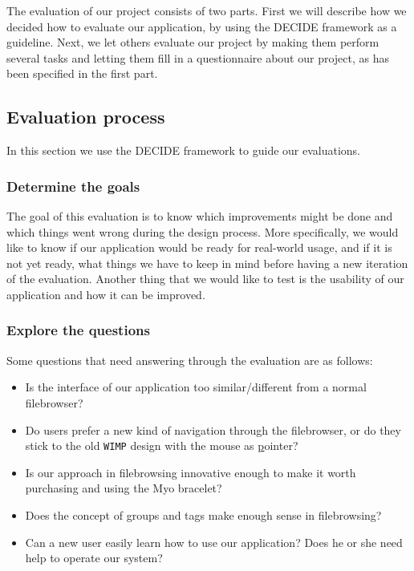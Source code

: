 \documentclass{article}
\begin{document}
The evaluation of our project consists of two parts. First we will describe how we decided how to evaluate our application, by using the DECIDE framework as a guideline. Next, we let others evaluate our project by making them perform several tasks and letting them fill in a questionnaire about our project, as has been specified in the first part.

\subsection{Evaluation process}
In this section we use the DECIDE framework to guide our evaluations.

\subsubsection{\textbf{D}etermine the goals}
The goal of this evaluation is to know which improvements might be done and which things went wrong during the design process. More specifically, we would like to know if our application would be ready for real-world usage, and if it is not yet ready, what things we have to keep in mind before having a new iteration of the evaluation. Another thing that we would like to test is the usability of our application and how it can be improved. 

\subsubsection{\textbf{E}xplore the questions}

Some questions that need answering through the evaluation are as follows:
\begin{itemize}
\item Is the interface of our application too similar/different from a normal filebrowser?
\item Do users prefer a new kind of navigation through the filebrowser, or do they stick to the old \texttt{WIMP} design with the mouse as \underline{p}ointer?
\item Is our approach in filebrowsing innovative enough to make it worth purchasing and using the Myo bracelet?
\item Does the concept of groups and tags make enough sense in filebrowsing?
\item Can a new user easily learn how to use our application? Does he or she need help to operate our system?
\end{itemize}
\end{document}
